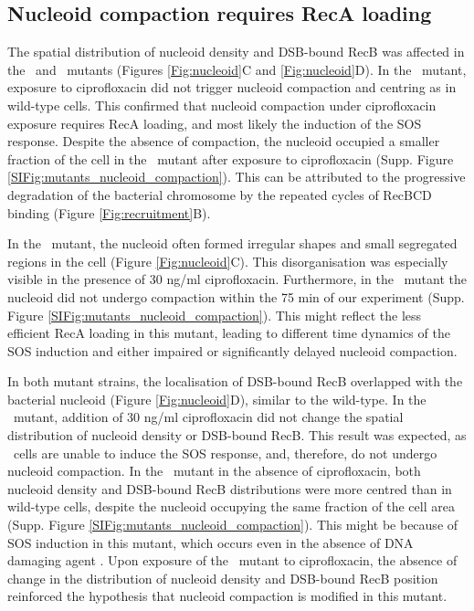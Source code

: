 \subsection*{Nucleoid compaction requires RecA loading}
The spatial distribution of nucleoid density and DSB-bound RecB was affected in the \dreca\ and \geneteneighty\ mutants (Figures \ref{Fig:nucleoid}C and \ref{Fig:nucleoid}D). In the \dreca\ mutant, exposure to ciprofloxacin did not trigger nucleoid compaction and centring as in wild-type cells. This confirmed that nucleoid compaction under ciprofloxacin exposure requires RecA loading, and most likely the induction of the SOS response. Despite the absence of compaction, the nucleoid occupied a smaller fraction of the cell in the \dreca\ mutant after exposure to ciprofloxacin (Supp. Figure \ref{SIFig:mutants_nucleoid_compaction}). This can be attributed to the progressive degradation of the bacterial chromosome by the repeated cycles of RecBCD binding (Figure \ref{Fig:recruitment}B).

In the \geneteneighty\ mutant, the nucleoid often formed irregular shapes and small segregated regions in the cell (Figure \ref{Fig:nucleoid}C). This disorganisation was especially visible in the presence of 30 ng/ml ciprofloxacin. Furthermore, in the \geneteneighty\ mutant the nucleoid did not undergo compaction within the 75 min of our experiment (Supp. Figure \ref{SIFig:mutants_nucleoid_compaction}). This might reflect the less efficient RecA loading in this mutant, leading to different time dynamics of the SOS induction and either impaired or significantly delayed nucleoid compaction.

In both mutant strains, the localisation of DSB-bound RecB overlapped with the bacterial nucleoid (Figure \ref{Fig:nucleoid}D), similar to the wild-type. In the \dreca\ mutant, addition of 30 ng/ml ciprofloxacin did not change the spatial distribution of nucleoid density or DSB-bound RecB. This result was expected, as \dreca\ cells are unable to induce the SOS response, and, therefore, do not undergo nucleoid compaction. In the \geneteneighty\ mutant in the absence of ciprofloxacin, both nucleoid density and DSB-bound RecB distributions were more centred than in wild-type cells, despite the nucleoid occupying the same fraction of the cell area (Supp. Figure \ref{SIFig:mutants_nucleoid_compaction}). This might be because of SOS induction in this mutant, which occurs even in the absence of DNA damaging agent \cite{Lepore2025}. Upon exposure of the \geneteneighty\ mutant to ciprofloxacin, the absence of change in the distribution of nucleoid density and DSB-bound RecB position reinforced the hypothesis that nucleoid compaction is modified in this mutant.
